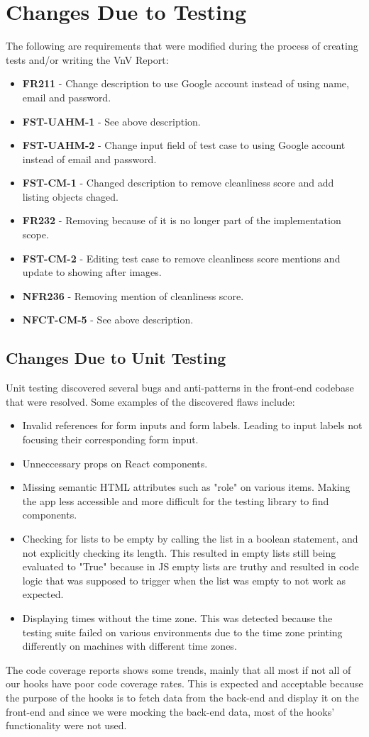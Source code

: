 \documentclass[12pt, titlepage]{article}
\begin{document}
\section{Changes Due to Testing}
The following are requirements that were modified during the process of creating tests and/or writing the VnV Report:
\begin{itemize}
\item\textbf{FR211} - Change description to use Google account instead of using name, email and password.
\item\textbf{FST-UAHM-1} - See above description. 
\item\textbf{FST-UAHM-2} - Change input field of test case to using Google account instead of email and password. 
\item\textbf{FST-CM-1} - Changed description to remove cleanliness score and add listing objects chaged.
\item\textbf{FR232} - Removing because of it is no longer part of the implementation scope. 
\item\textbf{FST-CM-2} - Editing test case to remove cleanliness score mentions and update to showing after images. 
\item\textbf{NFR236} - Removing mention of cleanliness score. 
\item\textbf{NFCT-CM-5} - See above description. 
\end{itemize}


\subsection{Changes Due to Unit Testing}
Unit testing discovered several bugs and anti-patterns in the front-end codebase that were resolved. Some examples of the discovered flaws include:
\begin{itemize}
\item Invalid references for form inputs and form labels. Leading to input labels not focusing their corresponding form input.
\item Unneccessary props on React components.
\item Missing semantic HTML attributes such as "role" on various items. Making the app less accessible and more difficult for the testing library to find components.
\item Checking for lists to be empty by calling the list in a boolean statement, and not explicitly checking its length. This resulted in empty lists still being evaluated to "True" because in JS empty lists are truthy and resulted in code logic that was supposed to trigger when the list was empty to not work as expected.
\item Displaying times without the time zone. This was detected because the testing suite failed on various environments due to the time zone printing differently on machines with different time zones.
\end{itemize}
The code coverage reports shows some trends, mainly that all most if not all of our hooks have poor code coverage rates. This is expected and acceptable because the purpose of the hooks is to fetch data from the back-end and display it on the front-end and since we were mocking the back-end data, most of the hooks' functionality were not used.
\end{document}
